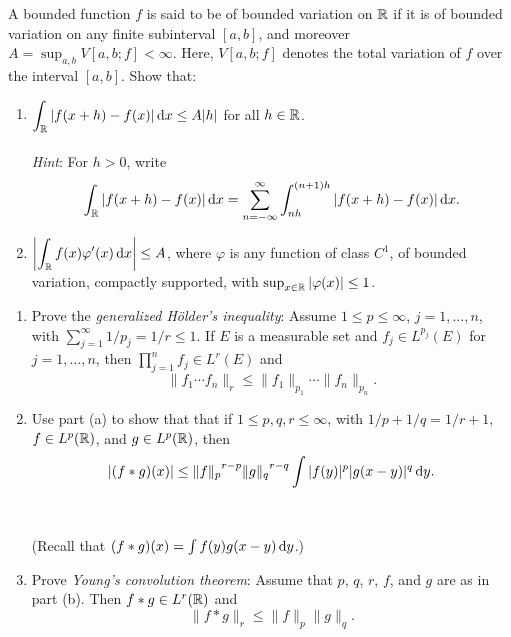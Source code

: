 \begin{problem}
A bounded function $f$ is said to be of bounded variation on $\mathbb{R}$ if it
is of bounded variation on any finite subinterval $[a,b]$, and moreover
$A=\sup_{a,b}V[a,b;f]<\infty$. Here, $V[a,b;f]$ denotes the total
variation of $f$ over the interval $[a,b]$. Show that:
\begin{enumerate}[label=(\alph*),noitemsep]
\item $\displaystyle\int_{\mathbb{R}}|f(x+h)-f(x)|\mathop{}\!\mathrm{d} x\leq A|h|$ for all
  $h\in\mathbb{R}$.
\\\\
\emph{Hint}: For $h>0$, write
\[
\int_{\mathbb{R}} |f(x+h)-f(x)|\mathop{}\!\mathrm{d} x=
\sum_{n=-\infty}^\infty\int_{nh}^{(n+1)h}|f(x+h)-f(x)|\mathop{}\!\mathrm{d} x.
\]
\item $\displaystyle\left|\int_{\mathbb{R}} f(x)\varphi'(x)\mathop{}\!\mathrm{d} x\right|\leq A$,
  where $\varphi$ is any function of class $C^1$, of bounded variation,
  compactly supported, with $\sup_{x\in\mathbb{R}}|\varphi(x)|\leq 1$.
\end{enumerate}
\end{problem}
\begin{solution}
\end{solution}

\begin{problem}
\begin{enumerate}[label=(\alph*),noitemsep]
\item Prove the \emph{generalized Hölder's inequality}: Assume
  $1\leq p\leq\infty$, $j=1,\dotsc,n$, with
  $\sum_{j=1}^\infty 1/p_j=1/r\leq 1$. If $E$ is a measurable set and
  $f_j\in L^{p_j}(E)$ for $j=1,\dotsc,n$, then
  $\prod_{j=1}^n f_j\in L^r(E)$ and
    \[
      \|f_1\dotsm f_n\|_r\leq\|f_1\|_{p_1}\dotsm\|f_n\|_{p_n}.
    \]
\item Use part (a) to show that that if $1\leq p,q,r\leq\infty$, with
  $1/p+1/q=1/r+1$, $f\in L^p(\mathbb{R})$, and $g\in L^p(\mathbb{R})$, then
\[
|(f*g)(x)|\leq{\|f\|_p}^{r-p}{\|g\|_q}^{r-q}\int|f(y)|^p|g(x-y)|^q\mathop{}\!\mathrm{d} y.
\]
\\\\
(Recall that $(f*g)(x)=\int f(y)g(x-y)\mathop{}\!\mathrm{d} y$.)
\item Prove \emph{Young's convolution theorem}: Assume that $p$, $q$, $r$,
  $f$, and $g$ are as in part (b). Then $f*g\in L^r(\mathbb{R})$ and
  \[
    \|f*g\|_r\leq\|f\|_p\|g\|_q.
  \]
\end{enumerate}
\end{problem}
\begin{solution}
\end{solution}


